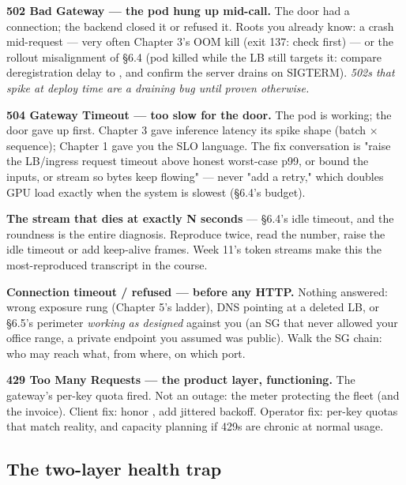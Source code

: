 \begin{tbbitemize}
  \item \textbf{502 Bad Gateway — the pod hung up mid-call.} The door had a connection; the backend closed it or refused it. Roots you already know: a crash mid-request — very often Chapter 3's OOM kill (exit 137: check  first) — or the rollout misalignment of §6.4 (pod killed while the LB still targets it: compare deregistration delay to , and confirm the server drains on SIGTERM). \textit{502s that spike at deploy time are a draining bug until proven otherwise.}
  \item \textbf{504 Gateway Timeout — too slow for the door.} The pod is working; the door gave up first. Chapter 3 gave inference latency its spike shape (batch × sequence); Chapter 1 gave you the SLO language. The fix conversation is "raise the LB/ingress request timeout above honest worst-case p99, or bound the inputs, or stream so bytes keep flowing" — never "add a retry," which doubles GPU load exactly when the system is slowest (§6.4's budget).
  \item \textbf{The stream that dies at exactly N seconds} — §6.4's idle timeout, and the roundness is the entire diagnosis. Reproduce twice, read the number, raise the idle timeout or add keep-alive frames. Week 11's token streams make this the most-reproduced transcript in the course.
  \item \textbf{Connection timeout / refused — before any HTTP.} Nothing answered: wrong exposure rung (Chapter 5's ladder), DNS pointing at a deleted LB, or §6.5's perimeter \textit{working as designed} against you (an SG that never allowed your office range, a private endpoint you assumed was public). Walk the SG chain: who may reach what, from where, on which port.
  \item \textbf{429 Too Many Requests — the product layer, functioning.} The gateway's per-key quota fired. Not an outage: the meter protecting the fleet (and the invoice). Client fix: honor , add jittered backoff. Operator fix: per-key quotas that match reality, and capacity planning if 429s are chronic at normal usage.
\end{tbbitemize}

\subsection*{The two-layer health trap}

